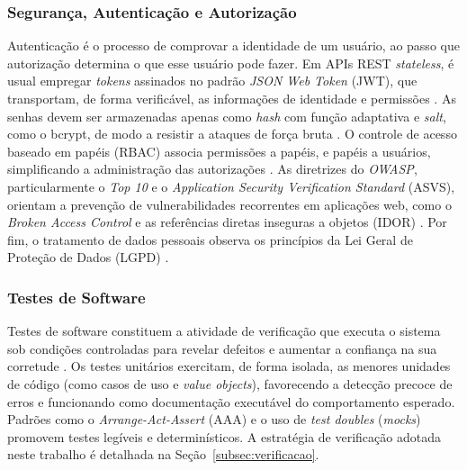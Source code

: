 \subsubsection{Segurança, Autenticação e Autorização}

Autenticação é o processo de comprovar a identidade de um usuário,
ao passo que autorização determina o que esse usuário pode fazer.
Em APIs REST \textit{stateless}, é usual empregar \textit{tokens} assinados no
padrão \textit{JSON Web Token} (JWT), que transportam, de forma verificável,
as informações de identidade e permissões \cite{rfc7519}. As senhas devem ser
armazenadas apenas como \textit{hash} com função adaptativa e \textit{salt},
como o bcrypt, de modo a resistir a ataques de força bruta
\cite{bcrypt}. O controle de acesso baseado em papéis (RBAC) associa
permissões a papéis, e papéis a usuários, simplificando a administração das
autorizações \cite{nistrbac}. As diretrizes do \textit{OWASP}, particularmente
o \textit{Top 10} e o \textit{Application Security Verification Standard}
(ASVS), orientam a prevenção de vulnerabilidades
recorrentes em aplicações web, como o \textit{Broken Access Control} e as
referências diretas inseguras a objetos (IDOR) \cite{owasptop10, owaspasvs}.
Por fim, o tratamento de dados pessoais observa os princípios da Lei Geral de
Proteção de Dados (LGPD) \cite{lgpd}.

\subsubsection{Testes de Software}

Testes de software constituem a atividade de verificação que executa o sistema
sob condições controladas para revelar defeitos e aumentar a confiança na sua
corretude \cite{pressman2016, sommerville2011}. Os testes unitários
exercitam, de forma isolada, as menores unidades de código (como casos de uso
e \textit{value objects}), favorecendo a detecção precoce de erros e
funcionando como documentação executável do comportamento esperado. Padrões
como o \textit{Arrange-Act-Assert} (AAA) e o uso de \textit{test doubles}
(\textit{mocks}) promovem testes legíveis e determinísticos. A estratégia de
verificação adotada neste trabalho é detalhada na Seção~\ref{subsec:verificacao}.
